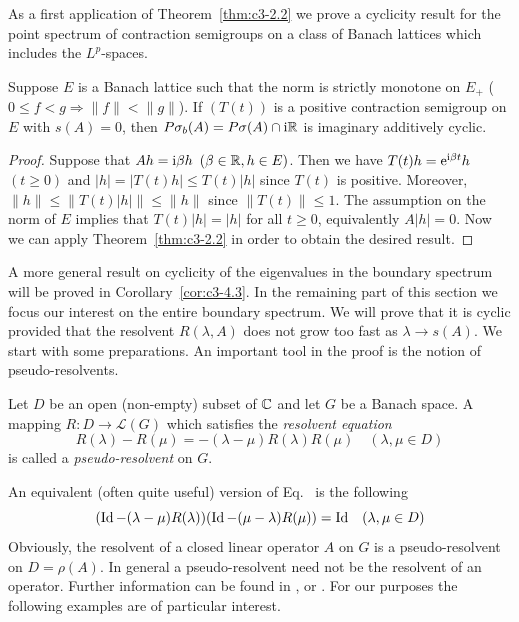 As a first application of Theorem~\ref{thm:c3-2.2} we prove a cyclicity result for the point spectrum of contraction semigroups on a class of Banach lattices which includes the $L^p$-spaces.

\begin{corollary}\label{cor:c3-2.3}
	Suppose $E$ is a Banach lattice such that the norm is strictly monotone on $E_{+}$ (\ie  $0 \leq f < g \Rightarrow \|f\| < \|g\|$).
	If\/ $(T(t))$ is a positive contraction semigroup on $E$ with $s(A) = 0$, then $P\sigma_{b}(A) = P\sigma(A) \cap \mathrm{i}\mathbb{R} $ is imaginary additively cyclic.
\end{corollary}
\begin{proof}
	Suppose that $Ah = \mathrm{i}\beta  h$ $(\beta \in \mathbb{R} , h \in E)$.
	Then we have $T(t)h = \mathrm{e}^{\mathrm{i}\beta  t}h$ $(t \geq 0)$ and $|h| = |T(t)h| \leq T(t)|h|$ since $T(t)$ is positive.
	Moreover, $\|h\| \leq \|T(t)|h|\| \leq \|h\|$ since $\|T(t)\| \leq 1$.
	The assumption on the norm of\/ $E$ implies that $T(t)|h| = |h|$ for all $t \geq 0$, equivalently $A|h| = 0$.
	Now we can apply Theorem~\ref{thm:c3-2.2} in order to obtain the desired result.
\end{proof}
A more general result on cyclicity of the eigenvalues in the boundary spectrum%
will be proved in Corollary~\ref{cor:c3-4.3}.
In the remaining part of this section we focus our interest on the entire boundary spectrum.
We will prove that it is cyclic 
provided that the resolvent $R(\lambda,A)$ does not grow too fast as $\lambda \to s(A)$.
We start with some preparations.
An important tool in the proof is the notion of pseudo-resolvents.
\begin{definition}\label{def:c3-2.4}
	Let $D$ be an open (non-empty) subset of\/ $\mathbb{C} $ and let $G$ be a Banach space.
	A mapping $R \colon D \to \mathcal{L}(G)$ which satisfies the \emph{resolvent equation}
	\begin{equation}\label{eq:c3-2.8}
		R(\lambda) - R(\mu) = -(\lambda - \mu)R(\lambda)R(\mu) \quad (\lambda,\mu \in D)
	\end{equation}
	is called a \emph{pseudo-resolvent} on $G$.
\end{definition}
An equivalent (often quite useful) version of Eq.~ is the following
\begin{equation}\label{eq:c3-2.9}
	(\operatorname{Id} - (\lambda - \mu)R(\lambda))(\operatorname{Id} - (\mu - \lambda)R(\mu)) = \operatorname{Id} \quad (\lambda,\mu \in D)
\end{equation}
Obviously, the resolvent of a closed linear operator $A$ on $G$ is a pseudo-resolvent on $D = \rho(A)$.
In general a pseudo-resolvent need not be the resolvent of an operator.
Further information can be found in \textcite{hillephillips:1957}, \textcite{pazy:1983} or \textcite{yosida:1965}.
For our purposes the following examples are of particular interest.

